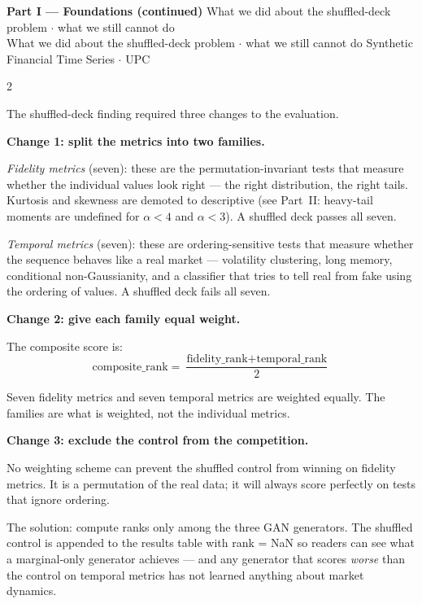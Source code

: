 \documentclass[10pt]{article}
\newcommand{\tealbox}[2]{\begin{tcolorbox}[mybox={Teal}{LBg},title={#1}]#2\end{tcolorbox}}
\newcommand{\pagehead}[2]{%
  \begin{tcolorbox}[enhanced,arc=0pt,outer arc=0pt,boxrule=0pt,
    colback=Navy,colframe=Navy,
    top=5pt,bottom=5pt,left=8pt,right=8pt,
    before skip=0pt,after skip=10pt]
  {\color{white}\large\bfseries #1}%
  \ifx\relax#2\relax\else\\[1pt]{\color{blue!30!white}\small #2}\fi
  \hfill{\color{blue!20!white}\footnotesize Synthetic Financial Time Series $\cdot$ UPC}
  \end{tcolorbox}}
\begin{document}
\clearpage

\pagehead{Part I --- Foundations (continued)}
         {What we did about the shuffled-deck problem $\cdot$ what we still cannot do}

\begin{multicols}{2}

\tealbox{8\quad What We Did About It}{%
The shuffled-deck finding required three changes to the evaluation.

\medskip
\textbf{Change 1: split the metrics into two families.}

\textit{Fidelity metrics} (seven): these are the permutation-invariant tests that measure whether the individual values look right --- the right distribution, the right tails. Kurtosis and skewness are demoted to descriptive (see Part~II: heavy-tail moments are undefined for $\alpha < 4$ and $\alpha < 3$). A shuffled deck passes all seven.

\textit{Temporal metrics} (seven): these are ordering-sensitive tests that measure whether the sequence behaves like a real market --- volatility clustering, long memory, conditional non-Gaussianity, and a classifier that tries to tell real from fake using the ordering of values. A shuffled deck fails all seven.

\medskip
\textbf{Change 2: give each family equal weight.}

The composite score is:
\begin{equation*}
  \text{composite\_rank} = \frac{\text{fidelity\_rank} + \text{temporal\_rank}}{2}
\end{equation*}

Seven fidelity metrics and seven temporal metrics are weighted equally. The families are what is weighted, not the individual metrics.

\medskip
\textbf{Change 3: exclude the control from the competition.}

No weighting scheme can prevent the shuffled control from winning on fidelity metrics. It is a permutation of the real data; it will always score perfectly on tests that ignore ordering.

The solution: compute ranks only among the three GAN generators. The shuffled control is appended to the results table with rank = NaN so readers can see what a marginal-only generator achieves --- and any generator that scores \emph{worse} than the control on temporal metrics has not learned anything about market dynamics.

}
\end{multicols}
\end{document}
